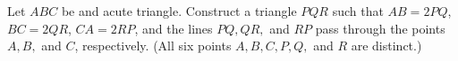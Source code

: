 Let $ABC$ be and acute triangle. Construct a triangle $PQR$ such that $ AB = 2PQ $,  $ BC = 2QR $,  $ CA = 2 RP $,  and the lines $ PQ, QR,$ and $RP$ pass through the points $ A, B , $ and $ C $,  respectively. (All six points $ A, B, C, P, Q, $ and $ R $ are distinct.)